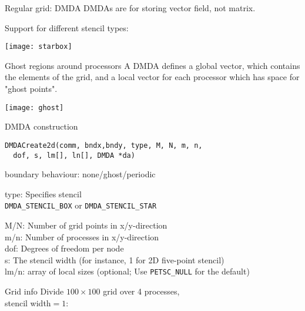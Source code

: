 

\begin{numberedframe}{Regular grid: DMDA}
DMDAs are for storing vector field, not matrix.

Support for different stencil types:

\texttt{[image: starbox]}
\end{numberedframe}

\begin{numberedframe}{Ghost regions around processors}
A DMDA defines a global vector, which contains the elements of the grid,
and a local vector for each processor which
has space for "ghost points".

\texttt{[image: ghost]}
\end{numberedframe}

\begin{numberedframe}{DMDA construction}
\begin{lstlisting}
DMDACreate2d(comm, bndx,bndy, type, M, N, m, n, 
  dof, s, lm[], ln[], DMDA *da)
\end{lstlisting}
\footnotesize
{} boundary behaviour: none/ghost/periodic

type: Specifies stencil\\
\lstinline{DMDA_STENCIL_BOX} or \lstinline{DMDA_STENCIL_STAR}

M/N: Number of grid points in x/y-direction\\
m/n: Number of processes in x/y-direction\\
dof: Degrees of freedom per node\\
s: The stencil width (for instance, 1 for 2D five-point stencil)\\
lm/n: array of local sizes (optional; 
Use \lstinline{PETSC_NULL} for the default)
\end{numberedframe}

\begin{numberedframe}{Grid info}
  Divide $100\times 100$ grid over 4 processes,\\
  stencil width$=1$:

  \def\codefontsize{\tiny}
\end{numberedframe}

